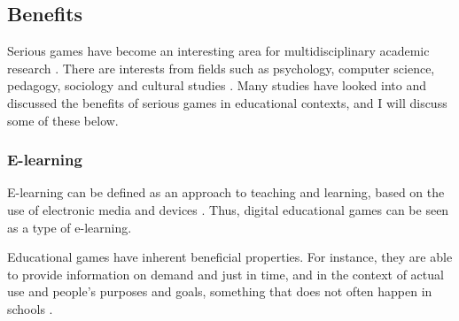 \documentclass[a4paper,11.5pt]{report}
\numberwithin{figure}{section}
\numberwithin{table}{section}
\numberwithin{equation}{section}
\numberwithin{equation}{section}
\begin{document}





\subsection{Benefits}

Serious games have become an interesting area for multidisciplinary academic research \citep{Breuer2010}. There are interests from fields such as psychology, computer science, pedagogy, sociology and cultural studies \citep{Breuer2010}. Many studies have looked into and discussed the benefits of serious games in educational contexts, and I will discuss some of these below.

\subsubsection{E-learning}

E-learning can be defined as an approach to teaching and learning, based on the use of electronic media and devices \citep{sangra2012}. Thus, digital educational games can be seen as a type of e-learning.

Educational games have inherent beneficial properties. For instance, they are able to provide information on demand and just in time, and in the context of actual use and people's purposes and goals, something that does not often happen in schools \citep{Gee2003}.
\end{document}
